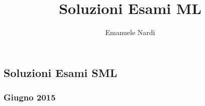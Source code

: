 
\author{Emanuele Nardi}
\title{Soluzioni Esami ML}

\newcommand{\pdfTitle}{UNITN -- Soluzioni Esami SML}
\newcommand{\tags}{SML}

\newcommand{\subject}{Programmazione Funzionale}
\newcommand{\authorName}{Emanuele Nardi}







\usepackage{mdframed}
\newcommand*{\myrule}{\noindent\hfil\rule{\textwidth}{.4pt}\hfil}




\begin{center}
    \section*{Soluzioni Esami SML}
\end{center}


\subsubsection*{Giugno 2015}

\begin{mdframed}
	\begin{mdframed}
		
		
	\end{mdframed}

	
\end{mdframed}

